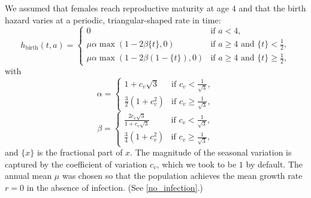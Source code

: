 \documentclass{article}
\begin{document}
We assumed that females reach reproductive maturity at age $4$ and
that the birth hazard varies at a periodic, triangular-shaped rate in
time:
\begin{equation}
  h_{\text{birth}}(t, a) =
  \begin{cases}
    0 & \text{if $a < 4$},
    \\
    \mu \alpha \max\left(1 - 2 \beta \{t\}, 0\right)
    & \text{if $a \geq 4$ and $\{t\} < \frac{1}{2}$},
    \\
    \mu \alpha \max\left(1 - 2 \beta (1 - \{t\}), 0\right)
    & \text{if $a \geq 4$ and $\{t\} \geq \frac{1}{2}$},
  \end{cases}
\end{equation}
with
\begin{equation}
  \alpha =
  \begin{cases}
    1 + c_v \sqrt{3}
    & \text{if $c_v < \frac{1}{\sqrt{3}}$},
    \\
    \frac{3}{2} \left(1 + c_v^2\right)
    & \text{if $c_v \geq \frac{1}{\sqrt{3}}$},
  \end{cases}
\end{equation}
\begin{equation}
  \beta =
  \begin{cases}
    \frac{2 c_v \sqrt{3}}{1 + c_v \sqrt{3}}
    & \text{if $c_v < \frac{1}{\sqrt{3}}$},
    \\
    \frac{3}{4} \left(1 + c_v^2\right)
    & \text{if $c_v \geq \frac{1}{\sqrt{3}}$},
  \end{cases}
\end{equation}
and $\{x\}$ is the fractional part of $x$.  The magnitude of the
seasonal variation is captured by the coefficient of variation $c_v$,
which we took to be $1$ by default.  The annual mean $\mu$ was chosen
so that the population achieves the mean growth rate $r = 0$ in the
absence of infection.  (See \autoref{no_infection}.)
\end{document}
